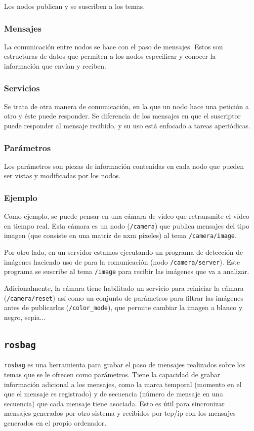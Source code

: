 Los nodos publican y se suscriben a los temas.

\subsubsection{Mensajes}
La comunicación entre nodos se hace con el paso de mensajes. Estos son estructuras de datos que permiten a los nodos especificar y conocer la información que envían y reciben.

\subsubsection{Servicios}
Se trata de otra manera de comunicación, en la que un nodo hace una petición a otro y éste puede responder. Se diferencia de los mensajes en que el suscriptor puede responder al mensaje recibido, y su uso está enfocado a tareas aperiódicas.

\subsubsection{Parámetros}
Los parámetros son piezas de información contenidas en cada nodo que pueden ser vistas y modificadas por los nodos.

\subsubsection{Ejemplo}
Como ejemplo, se puede pensar en una cámara de vídeo que retransmite el vídeo en tiempo real. Esta cámara es un nodo (\texttt{/camera}) que publica mensajes del tipo imagen (que consiste en una matriz de nxm píxeles) al tema \texttt{/camera/image}.

Por otro lado, en un servidor estamos ejecutando un programa de detección de imágenes haciendo uso de \ros para la comunicación (nodo \texttt{/camera/server}). Este programa se suscribe al tema \texttt{/image} para recibir las imágenes que va a analizar.

Adicionalmente, la cámara tiene habilitado un servicio para reiniciar la cámara (\texttt{/camera/reset}) así como un conjunto de parámetros para filtrar las imágenes antes de publicarlas (\texttt{/color\_mode}), que permite cambiar la imagen a blanco y negro, sepia...

\subsection{\texttt{rosbag}}
\label{subsec:metodos/rosbag}
\texttt{rosbag} es una herramienta para grabar el paso de mensajes realizados sobre los temas que se le ofrecen como parámetros. Tiene la capacidad de grabar información adicional a los mensajes, como la marca temporal (momento en el que el mensaje es registrado) y de secuencia (número de mensaje en una secuencia) que cada mensaje tiene asociada. Esto es útil para sincronizar mensajes generados por otro sistema y recibidos por tcp/ip con los mensajes generados en el propio ordenador.


